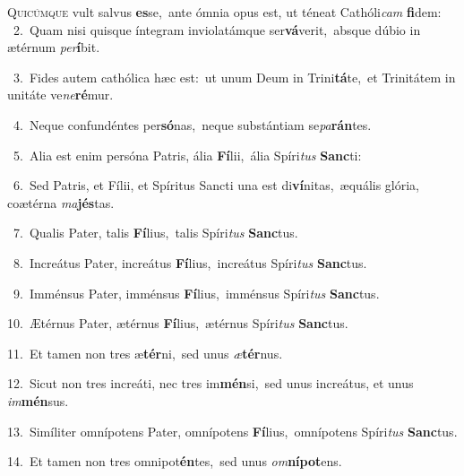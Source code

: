 \lettrine{\initial\textcolor{\initialcolor}{Q}}{uicúmque} vult salvus \textbf{es}\-se,~\star ante ómnia opus est, ut téneat Cathóli\textit{cam} \textbf{fi}\-dem:\\
{\numbfont\textcolor{\numbcolor}{~2.}}~Quam nisi quisque íntegram inviolatámque ser\-\textbf{vá}\-verit,~\star absque dúbio in ætérnum \textit{per}\-\textbf{í}bit.\par
{\numbfont\textcolor{\numbcolor}{~3.}}~Fides autem cathólica hæc est:~\dagger ut unum Deum in Trini\-\textbf{tá}\-te,~\star et Trinitátem in unitáte ve\-\textit{ne}\-\textbf{ré}mur.\par
{\numbfont\textcolor{\numbcolor}{~4.}}~Neque confundéntes per\-\textbf{só}\-nas,~\star neque substántiam se\-\textit{pa}\-\textbf{rán}tes.\par
{\numbfont\textcolor{\numbcolor}{~5.}}~Alia est enim persóna Patris, ália \textbf{Fí}\-lii,~\star ália Spíri\textit{tus} \textbf{Sanc}\-ti:\par
{\numbfont\textcolor{\numbcolor}{~6.}}~Sed Patris, et Fílii, et Spíritus Sancti una est di\-\textbf{ví}\-nitas,~\star æquális glória, coætérna \textit{ma}\-\textbf{jés}tas.\par
{\numbfont\textcolor{\numbcolor}{~7.}}~Qualis Pater, talis \textbf{Fí}\-lius,~\star talis Spíri\textit{tus} \textbf{Sanc}\-tus.\par
{\numbfont\textcolor{\numbcolor}{~8.}}~Increátus Pater, increátus \textbf{Fí}\-lius,~\star increátus Spíri\textit{tus} \textbf{Sanc}\-tus.\par
{\numbfont\textcolor{\numbcolor}{~9.}}~Imménsus Pater, imménsus \textbf{Fí}\-lius,~\star imménsus Spíri\textit{tus} \textbf{Sanc}\-tus.\par
{\numbfont\textcolor{\numbcolor}{10.}}~Ætérnus Pater, ætérnus \textbf{Fí}\-lius,~\star ætérnus Spíri\textit{tus} \textbf{Sanc}\-tus.\par
{\numbfont\textcolor{\numbcolor}{11.}}~Et tamen non tres æ\-\textbf{tér}\-ni,~\star sed unus \textit{æ}\-\textbf{tér}nus.\par
{\numbfont\textcolor{\numbcolor}{12.}}~Sicut non tres increáti, nec tres im\-\textbf{mén}\-si,~\star sed unus increátus, et unus \textit{im}\-\textbf{mén}sus.\par
{\numbfont\textcolor{\numbcolor}{13.}}~Simíliter omnípotens Pater, omnípotens \textbf{Fí}\-lius,~\star omnípotens Spíri\textit{tus} \textbf{Sanc}\-tus.\par
{\numbfont\textcolor{\numbcolor}{14.}}~Et tamen non tres omnipot\-\textbf{én}\-tes,~\star sed unus \textit{om}\-\textbf{ní}\textbf{pot}ens.\par
